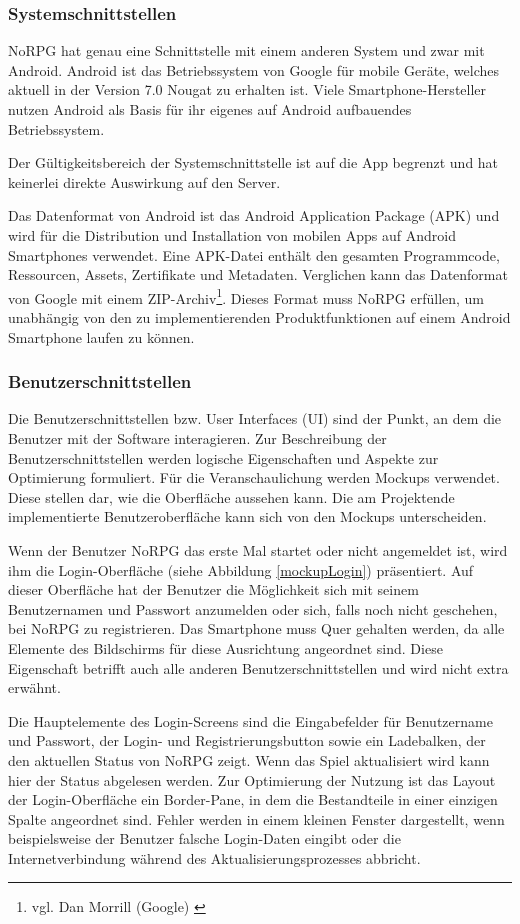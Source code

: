 		\subsubsection{Systemschnittstellen}
			NoRPG hat genau eine Schnittstelle mit einem anderen System und zwar mit Android. Android ist das Betriebssystem von Google für mobile Geräte, welches aktuell in der Version 7.0 Nougat zu erhalten ist. Viele Smartphone-Hersteller nutzen Android als Basis für ihr eigenes auf Android aufbauendes Betriebssystem. 
			
			Der Gültigkeitsbereich der Systemschnittstelle ist auf die App begrenzt und hat keinerlei direkte Auswirkung auf den Server. 
			
			Das Datenformat von Android ist das Android Application Package (APK) und wird für die Distribution und Installation von mobilen Apps auf Android Smartphones verwendet. Eine APK-Datei enthält den gesamten Programmcode, Ressourcen, Assets, Zertifikate und Metadaten. Verglichen kann das Datenformat von Google mit einem ZIP-Archiv\footnote{vgl. Dan Morrill (Google) \cite{google1}}. Dieses Format muss NoRPG erfüllen, um unabhängig von den zu implementierenden Produktfunktionen auf einem Android Smartphone laufen zu können.
			
		\subsubsection{Benutzerschnittstellen}
			Die Benutzerschnittstellen bzw. User Interfaces (UI) sind der Punkt, an dem die Benutzer mit der Software interagieren. Zur Beschreibung der Benutzerschnittstellen werden logische Eigenschaften und Aspekte zur Optimierung formuliert. Für die Veranschaulichung werden Mockups verwendet. Diese stellen dar, wie die Oberfläche aussehen kann. Die am Projektende implementierte Benutzeroberfläche kann sich von den Mockups unterscheiden.
			
			Wenn der Benutzer NoRPG das erste Mal startet oder nicht angemeldet ist, wird ihm die Login-Oberfläche (siehe Abbildung \ref{mockupLogin}) präsentiert. Auf dieser Oberfläche hat der Benutzer die Möglichkeit sich mit seinem Benutzernamen und Passwort anzumelden oder sich, falls noch nicht geschehen, bei NoRPG zu registrieren. Das Smartphone muss Quer gehalten werden, da alle Elemente des Bildschirms für diese Ausrichtung angeordnet sind. Diese Eigenschaft betrifft auch alle anderen Benutzerschnittstellen und wird nicht extra erwähnt.  
			
			Die Hauptelemente des Login-Screens sind die Eingabefelder für Benutzername und Passwort, der Login- und Registrierungsbutton sowie ein Ladebalken, der den aktuellen Status von NoRPG zeigt. Wenn das Spiel aktualisiert wird kann hier der Status abgelesen werden. Zur Optimierung der Nutzung ist das Layout der Login-Oberfläche ein Border-Pane, in dem die Bestandteile in einer einzigen Spalte angeordnet sind. Fehler werden in einem kleinen Fenster dargestellt, wenn beispielsweise der Benutzer falsche Login-Daten eingibt oder die Internetverbindung während des Aktualisierungsprozesses abbricht.

